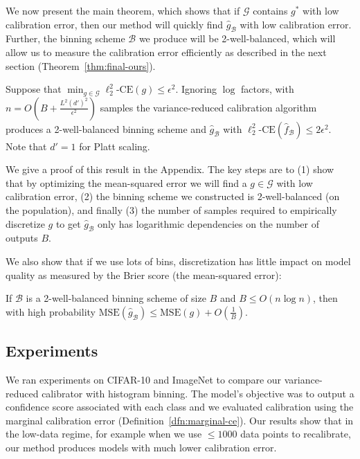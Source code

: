 We now present the main theorem, which shows that if $\mathcal{G}$ contains $g^*$ with low calibration error, then our method will quickly find $\hat{g}_{\mathcal{B}}$ with low calibration error. Further, the binning scheme $\mathcal{B}$ we produce will be 2-well-balanced, which will allow us to measure the calibration error efficiently as described in the next section (Theorem~\ref{thm:final-ours}).

\begin{theorem}
\label{thm:final-calib}
Suppose that $\min_{g \in \mathcal{G}}\ell_2^2\mbox{-CE}(g) \leq \epsilon^2$.
Ignoring $\log$ factors, with $n = O(B + \frac{L^2 (d')^2}{\epsilon^2})$ samples the variance-reduced calibration algorithm produces a 2-well-balanced binning scheme and $\hat{g}_{\mathcal{B}}$ with $\ell_2^2\mbox{-CE}(\hat{f}_{\mathcal{B}}) \leq 2 \epsilon^2$. Note that $d' = 1$ for Platt scaling.
\end{theorem}

We give a proof of this result in the Appendix. The key steps are to (1) show that by optimizing the mean-squared error we will find a $g \in \mathcal{G}$ with low calibration error, (2) the binning scheme we constructed is 2-well-balanced (on the population), and finally (3) the number of samples required to empirically discretize $g$ to get $\hat{g}_{\mathcal{B}}$ only has logarithmic dependencies on the number of outputs $B$.

We also show that if we use lots of bins, discretization has little impact on model quality as measured by the Brier score (the mean-squared error):

\begin{theorem}
\label{thm:sharpness-bound}
If $\mathcal{B}$ is a 2-well-balanced binning scheme of size $B$ and $B \leq O(n\log{n})$, then with high probability $\mbox{MSE}(\hat{g}_{\mathcal{B}}) \leq \mbox{MSE}(g) + O(\frac{1}{B})$.
\end{theorem}

\subsection{Experiments}

We ran experiments on CIFAR-10 and ImageNet to compare our variance-reduced calibrator with histogram binning. The model's objective was to output a confidence score associated with each class and we evaluated calibration using the marginal calibration error (Definition~\ref{dfn:marginal-ce}). Our results show that in the low-data regime, for example when we use $\leq 1000$ data points to recalibrate, our method produces models with much lower calibration error. 


